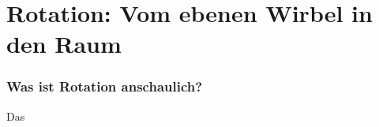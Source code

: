 \chapter{Rotation: Vom ebenen Wirbel in den Raum}



\subsection{Was ist Rotation anschaulich?}

Das 